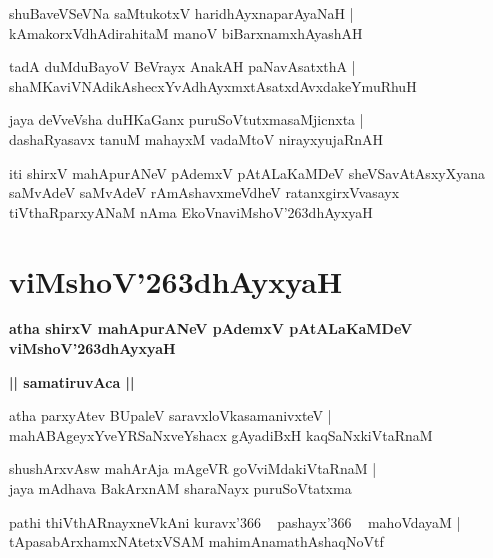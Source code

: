 \documentclass[twoside,12pt,openright]{book}
\def\S{\char'263}
\newcounter{shloka}[chapter]
\def\uvaca#1{\centerline{{\large\textbf{#1}}}}
\begin{document}
\begin{shloka}%
shuBaveVSeVNa saMtukotxV haridhAyxnaparAyaNaH |\\
kAmakorxVdhAdirahitaM manoV biBarxnamxhAyashAH 
\end{shloka}

\begin{shloka}%
tadA duMduBayoV BeVrayx AnakAH paNavAsatxthA |\\
shaMKaviVNAdikAshecxYvAdhAyxmxtAsatxdAvxdakeYmuRhuH
\end{shloka}

\begin{shloka}%
jaya deVveVsha duHKaGanx puruSoVtutxmasaMjicnxta |\\
dashaRyasavx tanuM mahayxM vadaMtoV nirayxyujaRnAH 
\end{shloka}

\begin{center}
iti shirxV mahApurANeV pAdemxV pAtALaKaMDeV sheVSavAtAsxyXyana saMvAdeV 
saMvAdeV rAmAshavxmeVdheV ratanxgirxVvasayx tiVthaRparxyANaM nAma EkoVnaviMshoV\S dhAyxyaH
\end{center}

\chapter{viMshoV\S dhAyxyaH}

\begin{center}
{\LARGE\bfseries atha shirxV mahApurANeV pAdemxV pAtALaKaMDeV viMshoV\S dhAyxyaH}
\end{center}

\uvaca{|| samatiruvAca ||}

\begin{shloka}%
atha parxyAtev BUpaleV saravxloVkasamanivxteV |\\
mahABAgeyxYveYRSaNxveYshacx gAyadiBxH kaqSaNxkiVtaRnaM 
\end{shloka}

\begin{shloka}%
shushArxvAsw mahArAja mAgeVR goVviMdakiVtaRnaM |\\
jaya mAdhava BakArxnAM sharaNayx puruSoVtatxma 
\end{shloka}

\begin{shloka}%
pathi thiVthARnayxneVkAni kuravx\char'366 ~ pashayx\char'366 ~ mahoVdayaM |\\
tApasabArxhamxNAtetxVSAM mahimAnamathAshaqNoVtf
\end{shloka}
\end{document}

